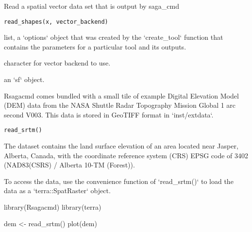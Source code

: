 \documentclass[a4paper]{book}
\begin{document}
%
\begin{Description}
Read a spatial vector data set that is output by saga\_cmd
\end{Description}
%
\begin{Usage}
\begin{verbatim}
read_shapes(x, vector_backend)
\end{verbatim}
\end{Usage}
%
\begin{Arguments}
\begin{ldescription}
\item[\code{x}] list, a `options` object that was created by the `create\_tool`
function that contains the parameters for a particular tool and its
outputs.

\item[\code{vector\_backend}] character for vector backend to use.
\end{ldescription}
\end{Arguments}
%
\begin{Value}
an `sf` object.
\end{Value}
%
\begin{Description}
Rsagacmd comes bundled with a small tile of example Digital Elevation Model
(DEM) data from the NASA Shuttle Radar Topography Mission Global 1 arc second
V003. This data is stored in GeoTIFF format in `inst/extdata`.
\end{Description}
%
\begin{Usage}
\begin{verbatim}
read_srtm()
\end{verbatim}
\end{Usage}
%
\begin{Details}
The dataset contains the land surface elevation of an area located near
Jasper, Alberta, Canada, with the coordinate reference system (CRS) EPSG code
of 3402 (NAD83(CSRS) / Alberta 10-TM (Forest)).

To access the data, use the convenience function of `read\_srtm()` to load
the data as a `terra::SpatRaster` object.
\end{Details}
%
\begin{Examples}
\begin{ExampleCode}
library(Rsagacmd)
library(terra)

dem <- read_srtm()
plot(dem)
\end{ExampleCode}
\end{Examples}
\end{document}
